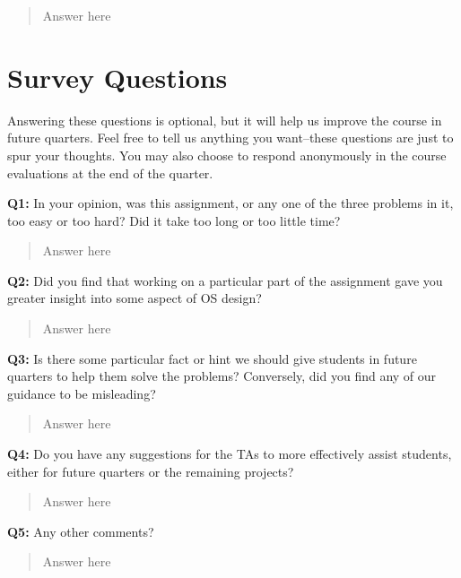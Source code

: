 \documentclass[a4paper,11pt]{paper}
\begin{document}
\begin{quote}
  Answer here
\end{quote}

\section{Survey Questions}

Answering these questions is optional, but it will help us improve the course in future quarters.  Feel free to tell us anything you want--these questions are just to spur your thoughts.  You may also choose to respond anonymously in the course evaluations at the end of the quarter.

\textbf{Q1:} In your opinion, was this assignment, or any one of the three
problems in it, too easy or too hard?  Did it take too long or too little time?

\begin{quote}
  Answer here
\end{quote}

\textbf{Q2:} Did you find that working on a particular part of the assignment
gave you greater insight into some aspect of OS design?

\begin{quote}
  Answer here
\end{quote}

\textbf{Q3:} Is there some particular fact or hint we should give students in
future quarters to help them solve the problems?  Conversely, did you find any
of our guidance to be misleading?

\begin{quote}
  Answer here
\end{quote}

\textbf{Q4:} Do you have any suggestions for the TAs to more effectively assist
students, either for future quarters or the remaining projects?

\begin{quote}
  Answer here
\end{quote}

\textbf{Q5:} Any other comments?

\begin{quote}
  Answer here
\end{quote}
\end{document}
